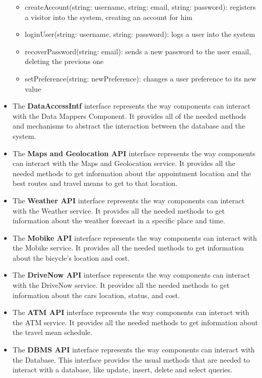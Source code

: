 \documentclass[12pt]{article}
\begin{document}
\begin{itemize}
    \begin{itemize}
        \item createAccount(string: username, string: email, string: password): registers a visitor into the system, creating an account for him
        \item loginUser(string: username, string: password): logs a user into the system
         \item recoverPassword(string: email): sends a new password to the user email, deleting the previous one
        \item setPreference(string: newPreference): changes a user preference to its new value
    \end{itemize}
    \item The \textbf{DataAccessIntf} interface represents the way components can interact with the Data Mappers Component. It provides all of the needed methods and mechanisms to abstract the interaction between the database and the system.
    \item The \textbf{Maps and Geolocation API} interface represents the way components can interact with the Maps and Geolocation service. It provides all the needed methods to get information about the appointment location and the best routes and travel means to get to that location.
    \item The \textbf{Weather API} interface represents the way components can interact with the Weather service. It provides all the needed methods to get information about the weather forecast in a specific place and time.
    \item The \textbf{Mobike API} interface represents the way components can interact with the Mobike service. It provides all the needed methods to get information about the bicycle's location and cost.
    \item The \textbf{DriveNow API} interface represents the way components can interact with the DriveNow service. It provides all the needed methods to get information about the cars location, status, and cost.
    \item The \textbf{ATM API} interface represents the way components can interact with the ATM service. It provides all the needed methods to get information about the travel mean schedule.
    \item The \textbf{DBMS API} interface represents the way components can interact with the Database. This interface provides the usual methods that are needed to interact with a database, like update, insert, delete and select queries.
\end{itemize}
\end{document}
